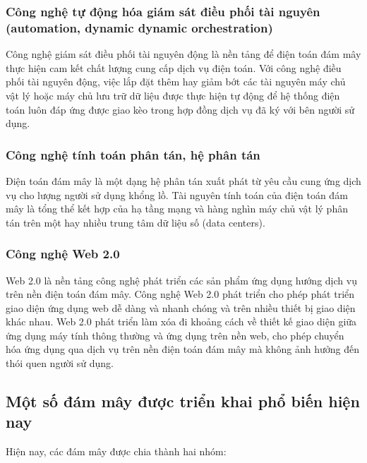 \subsubsection{Công nghệ tự động hóa giám sát điều phối tài nguyên (automation, dynamic dynamic orchestration)}
Công nghệ giám sát điều phối tài nguyên động là nền tảng để điện toán đám mây thực hiện cam kết chất lượng cung cấp dịch vụ điện toán. Với công nghệ điều phối tài nguyên động, việc lắp đặt thêm hay giảm bớt các tài nguyên máy chủ vật lý hoặc máy chủ lưu trữ dữ liệu được thực hiện tự động để hệ thống điện toán luôn đáp ứng được giao kèo trong hợp đồng dịch vụ đã ký với bên người sử dụng.

\subsubsection{Công nghệ tính toán phân tán, hệ phân tán}
Điện toán đám mây là một dạng hệ phân tán xuất phát từ yêu cầu cung ứng dịch vụ cho lượng người sử dụng khổng lồ. Tài nguyên tính toán của điện toán đám mây là tổng thể kết hợp của hạ tầng mạng và hàng nghìn máy chủ vật lý phân tán trên một hay nhiều trung tâm dữ liệu số (data centers).

\subsubsection{Công nghệ Web 2.0}
Web 2.0 là nền tảng công nghệ phát triển các sản phẩm ứng dụng hướng dịch vụ trên nền điện toán đám mây. Công nghệ Web 2.0 phát triển cho phép phát triển giao diện ứng dụng web dễ dàng và nhanh chóng và trên nhiều thiết bị giao diện khác nhau. Web 2.0 phát triển làm xóa đi khoảng cách về thiết kế giao diện giữa ứng dụng máy tính thông thường và ứng dụng trên nền web, cho phép chuyển hóa ứng dụng qua dịch vụ trên nền điện toán đám mây mà không ảnh hưởng đến thói quen người sử dụng.

\subsection{Một số đám mây được triển khai phổ biến hiện nay}
Hiện nay, các đám mây được chia thành hai nhóm:

